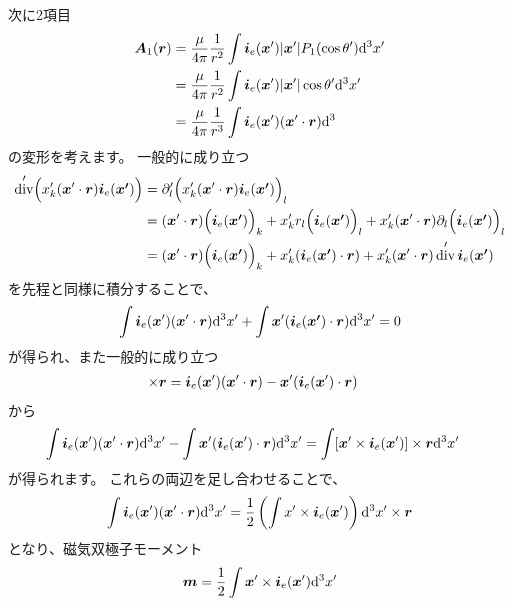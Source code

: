 \documentclass[a4paper, 12pt]{jsarticle}
\def\vec#1{\mbox{\boldmath $#1$}}
\newcommand{\ddif}{{\rm d}}
\DeclareMathOperator{\Div}{div}
\begin{document}
次に2項目
\begin{align}
	\vec{A}_1(\vec{r}) &= \frac{\mu}{4\pi} \frac{1}{r^2}
	\int \vec{i}_e(\vec{x}') |\vec{x}'| P_1(\cos \theta') \ddif^3 x' \\
	&= \frac{\mu}{4\pi} \frac{1}{r^2}
	\int \vec{i}_e(\vec{x}') |\vec{x}'| \cos \theta' \ddif^3 x' \\
	&= \frac{\mu}{4\pi} \frac{1}{r^3}
	\int \vec{i}_e(\vec{x}') (\vec{x}' \cdot \vec{r}) \ddif^3
\end{align}
の変形を考えます。
一般的に成り立つ
\begin{align}
	\Div' \Bigl( x'_k (\vec{x}' \cdot \vec{r}) \vec{i}_e(\vec{x'}) \Bigr)
	&= \partial'_l
	\Bigl( x'_k (\vec{x}' \cdot \vec{r}) \vec{i}_e(\vec{x'}) \Bigr)_l \\
	&= (\vec{x}' \cdot \vec{r}) \Bigl( \vec{i}_e(\vec{x'}) \Bigr)_k
	+ x'_k r_l \Bigl( \vec{i}_e(\vec{x'}) \Bigr)_l
	+ x'_k (\vec{x}' \cdot \vec{r}) \partial_l \Bigl( \vec{i}_e(\vec{x'}) \Bigr)_l
	\\
	&= (\vec{x}' \cdot \vec{r}) \Bigl( \vec{i}_e(\vec{x'}) \Bigr)_k
	+ x'_k (\vec{i}_e(\vec{x'}) \cdot \vec{r})
	+ x'_k (\vec{x}' \cdot \vec{r}) \Div' \vec{i}_e(\vec{x'})
\end{align}
を先程と同様に積分することで、
\begin{align}
	\int \vec{i}_e(\vec{x}') (\vec{x}' \cdot \vec{r}) \ddif^3 x'
	+ \int \vec{x}' (\vec{i}_e(\vec{x'}) \cdot \vec{r}) \ddif^3 x'
	= 0
\end{align}
が得られ、また一般的に成り立つ
\begin{align}
	[\vec{x}' \times \vec{i}_e(\vec{x}')] \times \vec{r}
	&= \vec{i}_e(\vec{x}') (\vec{x}' \cdot \vec{r})
	- \vec{x}' (\vec{i}_e(\vec{x}') \cdot \vec{r})
\end{align}
から
\begin{align}
	\int \vec{i}_e(\vec{x}') (\vec{x}' \cdot \vec{r}) \ddif^3 x'
	- \int \vec{x}' (\vec{i}_e(\vec{x}') \cdot \vec{r}) \ddif^3 x'
	&= \int [\vec{x}' \times \vec{i}_e(\vec{x}')] \times \vec{r} \ddif^3 x'
\end{align}
が得られます。
これらの両辺を足し合わせることで、
\begin{align}
	\int \vec{i}_e(\vec{x}') (\vec{x}' \cdot \vec{r}) \ddif^3 x'
	= \frac{1}{2} \left( \int x' \times \vec{i}_e(\vec{x}') \right) \ddif^3 x'
	\times \vec{r}
\end{align}
となり、磁気双極子モーメント
\begin{align}
	\vec{m} = \frac{1}{2} \int \vec{x}' \times \vec{i}_e(\vec{x}') \ddif^3 x'
\end{align}
\end{document}

